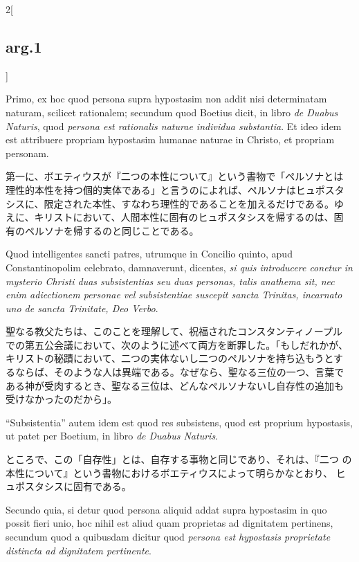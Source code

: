\documentclass[paper=a4paper,fontsize=10pt,jafontsize=9pt,titlepage]{jlreq}
\begin{document}
\begin{paracol}{2}[\subsection{arg.1}]
\switchcolumn*

Primo, ex hoc quod persona supra hypostasim non addit nisi
determinatam naturam, scilicet rationalem; secundum quod Boetius
dicit, in libro {\itshape de Duabus Naturis}, quod {\itshape persona
est rationalis naturae individua substantia}.  Et ideo idem est
attribuere propriam hypostasim humanae naturae in Christo, et propriam
personam.

\switchcolumn

第一に、ボエティウスが『二つの本性について』という書物で「ペルソナとは
理性的本性を持つ個的実体である」と言うのによれば、ペルソナはヒュポスタ
シスに、限定された本性、すなわち理性的であることを加えるだけである。ゆ
えに、キリストにおいて、人間本性に固有のヒュポスタシスを帰するのは、固
有のペルソナを帰するのと同じことである。

\switchcolumn*

Quod intelligentes sancti patres, utrumque in Concilio quinto, apud
Constantinopolim celebrato, damnaverunt, dicentes, {\itshape si quis
introducere conetur in mysterio Christi duas subsistentias seu duas
personas, talis anathema sit, nec enim adiectionem personae vel
subsistentiae suscepit sancta Trinitas, incarnato uno de sancta
Trinitate, Deo Verbo}.

\switchcolumn

聖なる教父たちは、このことを理解して、祝福されたコンスタンティノープル
での第五公会議において、次のように述べて両方を断罪した。「もしだれかが、
キリストの秘蹟において、二つの実体ないし二つのペルソナを持ち込もうとす
るならば、そのような人は異端である。なぜなら、聖なる三位の一つ、言葉で
ある神が受肉するとき、聖なる三位は、どんなペルソナないし自存性の追加も
受けなかったのだから」。

\switchcolumn*

``Subsistentia'' autem idem est quod res subsistens, quod est proprium
hypostasis, ut patet per Boetium, in libro {\itshape de Duabus
Naturis}.

\switchcolumn

ところで、この「自存性」とは、自存する事物と同じであり、それは、『二つ
の本性について』という書物におけるボエティウスによって明らかなとおり、
ヒュポスタシスに固有である。

\switchcolumn*

Secundo quia, si detur quod persona aliquid addat supra hypostasim in
quo possit fieri unio, hoc nihil est aliud quam proprietas ad
dignitatem pertinens, secundum quod a quibusdam dicitur quod {\itshape
persona est hypostasis proprietate distincta ad dignitatem
pertinente}.


\end{paracol}
\end{document}
